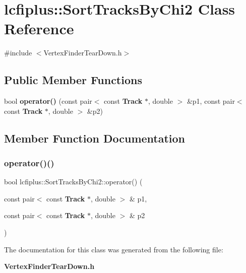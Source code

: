 \section{lcfiplus\+:\+:Sort\+Tracks\+By\+Chi2 Class Reference}
\label{classlcfiplus_1_1SortTracksByChi2}


{\ttfamily \#include $<$Vertex\+Finder\+Tear\+Down.\+h$>$}

\subsection*{Public Member Functions}
\begin{DoxyCompactItemize}
\item 
bool \textbf{ operator()} (const pair$<$ const \textbf{ Track} $\ast$, double $>$ \&p1, const pair$<$ const \textbf{ Track} $\ast$, double $>$ \&p2)
\end{DoxyCompactItemize}


\subsection{Member Function Documentation}
\mbox{\label{classlcfiplus_1_1SortTracksByChi2_a1bc5ce253e588586640155948ecc5791}} 
\subsubsection{operator()()}
{\footnotesize\ttfamily bool lcfiplus\+::\+Sort\+Tracks\+By\+Chi2\+::operator() (\begin{DoxyParamCaption}\item[{const pair$<$ const \textbf{ Track} $\ast$, double $>$ \&}]{p1,  }\item[{const pair$<$ const \textbf{ Track} $\ast$, double $>$ \&}]{p2 }\end{DoxyParamCaption})\hspace{0.3cm}{\ttfamily [inline]}}



The documentation for this class was generated from the following file\+:\begin{DoxyCompactItemize}
\item 
\textbf{ Vertex\+Finder\+Tear\+Down.\+h}\end{DoxyCompactItemize}
